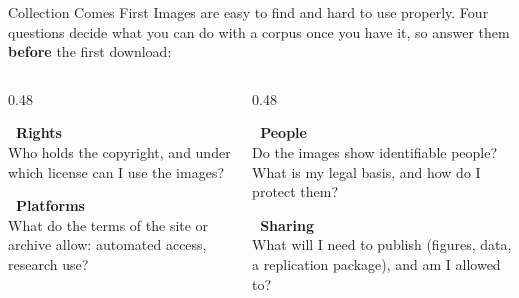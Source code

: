 \newcommand{\coursemodule}{Module 02}





\begin{frame}{Collection Comes First}
Images are easy to find and hard to use properly. Four questions decide what you can do with a
corpus once you have it, so answer them \textbf{before} the first download:

\vspace{0.2cm}
\begin{columns}[T]
\begin{column}{0.48\textwidth}
\begin{greenbox}
\textbf{\faBalanceScale\ Rights}\\
Who holds the copyright, and under which license can I use the images?
\end{greenbox}
\begin{greenbox}
\textbf{\faGlobeEurope\ Platforms}\\
What do the terms of the site or archive allow: automated access, research use?
\end{greenbox}
\end{column}
\begin{column}{0.48\textwidth}
\begin{greenbox}
\textbf{\faUsers\ People}\\
Do the images show identifiable people? What is my legal basis, and how do I protect them?
\end{greenbox}
\begin{greenbox}
\textbf{\faDatabase\ Sharing}\\
What will I need to publish (figures, data, a replication package), and am I allowed to?
\end{greenbox}
\end{column}
\end{columns}
\end{frame}

